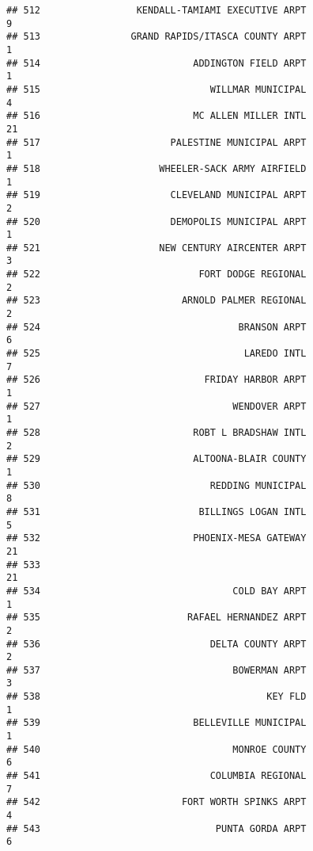\documentclass[
]{article}
\begin{document}
\begin{verbatim}
## 512                 KENDALL-TAMIAMI EXECUTIVE ARPT                           9
## 513                GRAND RAPIDS/ITASCA COUNTY ARPT                           1
## 514                           ADDINGTON FIELD ARPT                           1
## 515                              WILLMAR MUNICIPAL                           4
## 516                           MC ALLEN MILLER INTL                          21
## 517                       PALESTINE MUNICIPAL ARPT                           1
## 518                     WHEELER-SACK ARMY AIRFIELD                           1
## 519                       CLEVELAND MUNICIPAL ARPT                           2
## 520                       DEMOPOLIS MUNICIPAL ARPT                           1
## 521                     NEW CENTURY AIRCENTER ARPT                           3
## 522                            FORT DODGE REGIONAL                           2
## 523                         ARNOLD PALMER REGIONAL                           2
## 524                                   BRANSON ARPT                           6
## 525                                    LAREDO INTL                           7
## 526                             FRIDAY HARBOR ARPT                           1
## 527                                  WENDOVER ARPT                           1
## 528                           ROBT L BRADSHAW INTL                           2
## 529                           ALTOONA-BLAIR COUNTY                           1
## 530                              REDDING MUNICIPAL                           8
## 531                            BILLINGS LOGAN INTL                           5
## 532                           PHOENIX-MESA GATEWAY                          21
## 533                                                                         21
## 534                                  COLD BAY ARPT                           1
## 535                          RAFAEL HERNANDEZ ARPT                           2
## 536                              DELTA COUNTY ARPT                           2
## 537                                  BOWERMAN ARPT                           3
## 538                                        KEY FLD                           1
## 539                           BELLEVILLE MUNICIPAL                           1
## 540                                  MONROE COUNTY                           6
## 541                              COLUMBIA REGIONAL                           7
## 542                         FORT WORTH SPINKS ARPT                           4
## 543                               PUNTA GORDA ARPT                           6

\end{verbatim}
\end{document}
